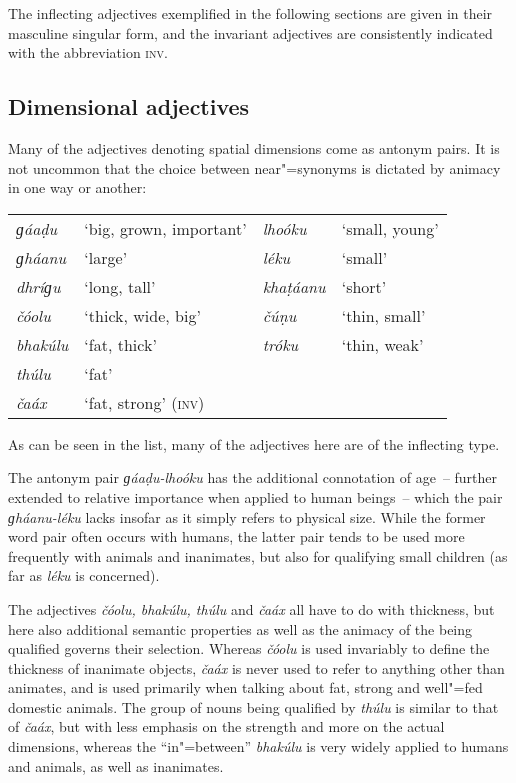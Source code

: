 The inflecting adjectives exemplified in the following sections are given in their masculine singular form, and the invariant adjectives are consistently indicated with the abbreviation \textsc{inv}.


\subsection{Dimensional adjectives}
\label{subsec:6-2-1}

Many of the adjectives denoting spatial dimensions come as antonym pairs. It is not uncommon that the choice between near"=synonyms is dictated by animacy in one way or another:



\begin{table}[H]
\begin{tabularx}{\textwidth}{ l Q l Q }
\textit{ɡáaḍu} &
`big, grown, important' &
\textit{lhoóku} &
`small, young'\\
\textit{ɡháanu} &
`large' &
\textit{léku} &
`small'\\
\textit{dhríɡu} &
`long, tall' &
\textit{khaṭáanu} &
`short'\\
\textit{čóolu} &
`thick, wide, big' &
\textit{čúṇu} &
`thin, small'\\
\textit{bhakúlu} &
`fat, thick' &
\textit{tróku} &
`thin, weak'\\
\textit{thúlu} &
`fat' &
&
\\
\textit{čaáx} &
`fat, strong' (\textsc{inv)} &
&
\\
\end{tabularx}
\end{table}


As can be seen in the list, many of the adjectives here are of the inflecting type.


The antonym pair \textit{ɡáaḍu-lhoóku} has the additional connotation of age~-- further extended to relative importance when applied to human beings~-- which the pair \textit{ɡháanu-léku} lacks insofar as it simply refers to physical size. While the former word pair often occurs with humans, the latter pair tends to be used more frequently with animals and inanimates, but also for qualifying small children (as far as \textit{léku} is concerned).



The adjectives \textit{čóolu, bhakúlu, thúlu} and \textit{čaáx} all have to do with thickness, but here also additional semantic properties as well as the animacy of the  being qualified governs their selection. Whereas \textit{čóolu} is used invariably to define the thickness of inanimate objects, \textit{čaáx} is never used to refer to anything other than animates, and is used primarily when talking about fat, strong and well"=fed domestic animals. The group of nouns being qualified by \textit{thúlu} is similar to that of \textit{čaáx}, but with less emphasis on the strength and more on the actual dimensions, whereas the ``in"=between''  \textit{bhakúlu} is very widely applied to humans and animals, as well as inanimates. 



